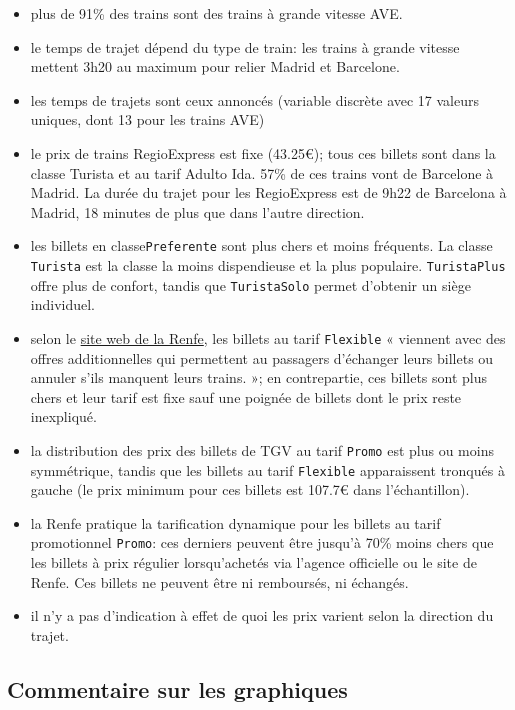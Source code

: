\documentclass[
  11pt,
  letterpaper,
]{book}
\providecommand{\tightlist}{%
  \setlength{\itemsep}{0pt}\setlength{\parskip}{0pt}}
\theoremstyle{definition}
\theoremstyle{definition}
\theoremstyle{definition}
\theoremstyle{remark}
\begin{document}
\begin{itemize}
\tightlist
\item
  plus de 91\% des trains sont des trains à grande vitesse AVE.
\item
  le temps de trajet dépend du type de train: les trains à grande vitesse mettent 3h20 au maximum pour relier Madrid et Barcelone.
\item
  les temps de trajets sont ceux annoncés (variable discrète avec 17 valeurs uniques, dont 13 pour les trains AVE)
\item
  le prix de trains RegioExpress est fixe (43.25€); tous ces billets sont dans la classe Turista et au tarif Adulto Ida. 57\% de ces trains vont de Barcelone à Madrid. La durée du trajet pour les RegioExpress est de 9h22 de Barcelona à Madrid, 18 minutes de plus que dans l'autre direction.
\item
  les billets en classe\texttt{Preferente} sont plus chers et moins fréquents. La classe \texttt{Turista} est la classe la moins dispendieuse et la plus populaire. \texttt{TuristaPlus} offre plus de confort, tandis que \texttt{TuristaSolo} permet d'obtenir un siège individuel.
\item
  selon le \href{https://www.renfe.com/es/es/viajar/tarifas/billetes.html}{site web de la Renfe}, les billets au tarif \texttt{Flexible} « viennent avec des offres additionnelles qui permettent au passagers d'échanger leurs billets ou annuler s'ils manquent leurs trains. »; en contrepartie, ces billets sont plus chers et leur tarif est fixe sauf une poignée de billets dont le prix reste inexpliqué.
\item
  la distribution des prix des billets de TGV au tarif \texttt{Promo} est plus ou moins symmétrique, tandis que les billets au tarif \texttt{Flexible} apparaissent tronqués à gauche (le prix minimum pour ces billets est 107.7€ dans l'échantillon).
\item
  la Renfe pratique la tarification dynamique pour les billets au tarif promotionnel \texttt{Promo}: ces derniers peuvent être jusqu'à 70\% moins chers que les billets à prix régulier lorsqu'achetés via l'agence officielle ou le site de Renfe. Ces billets ne peuvent être ni remboursés, ni échangés.
\item
  il n'y a pas d'indication à effet de quoi les prix varient selon la direction du trajet.
\end{itemize}

\hypertarget{commentaire-sur-les-graphiques}{%
\subsection{Commentaire sur les graphiques}\label{commentaire-sur-les-graphiques}}
\end{document}
